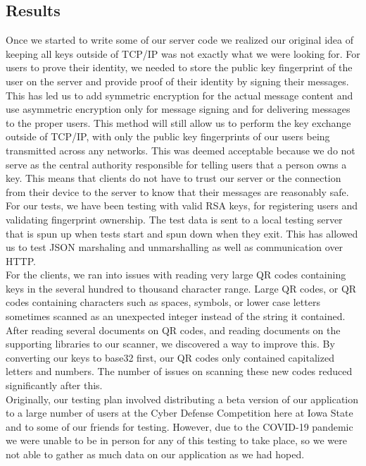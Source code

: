 \documentclass[11pt]{article}
\begin{document}
\subsection{Results}

Once we started to write some of our server code we realized our original idea of keeping all keys outside of TCP/IP was not exactly what we were looking for. For users to prove their identity, we needed to store the public key fingerprint of the user on the server and provide proof of their identity by signing their messages. This has led us to add symmetric encryption for the actual message content and use asymmetric encryption only for message signing and for delivering messages to the proper users. This method will still allow us to perform the key exchange outside of TCP/IP, with only the public key fingerprints of our users being transmitted across any networks. This was deemed acceptable because we do not serve as the central authority responsible for telling users that a person owns a key. This means that clients do not have to trust our server or the connection from their device to the server to know that their messages are reasonably safe.\\

For our tests, we have been testing with valid RSA keys, for registering users and validating fingerprint ownership. The test data is sent to a local testing server that is spun up when tests start and spun down when they exit. This has allowed us to test JSON marshaling and unmarshalling as well as communication over HTTP.\\


For the clients, we ran into issues with reading very large QR codes containing keys in the several hundred to thousand character range. Large QR codes, or QR codes containing characters such as spaces, symbols, or lower case letters sometimes scanned as an unexpected integer instead of the string it contained. After reading several documents on QR codes, and reading documents on the supporting libraries to our scanner, we discovered a way to improve this. By converting our keys to base32 first, our QR codes only contained capitalized letters and numbers. The number of issues on scanning these new codes reduced significantly after this.\\

Originally, our testing plan involved distributing a beta version of our application to a large number of users at the Cyber Defense Competition here at Iowa State and to some of our friends for testing. However, due to the COVID-19 pandemic we were unable to be in person for any of this testing to take place, so we were not able to gather as much data on our application as we had hoped. \\
\end{document}
